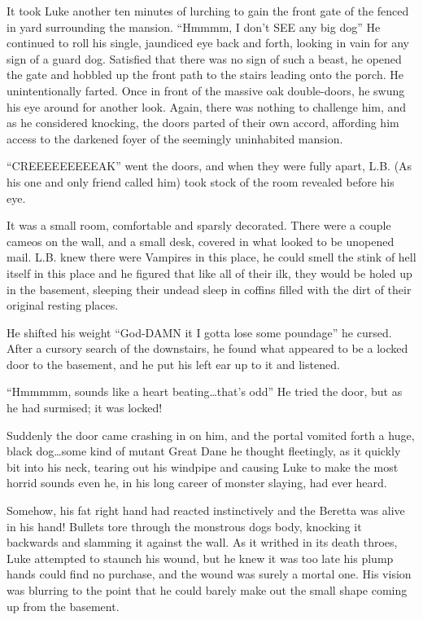 It took Luke another ten minutes of lurching to gain the front gate
of the fenced in yard surrounding the mansion. ``Hmmmm, I don't SEE
any big dog'' He continued to roll his single, jaundiced eye back
and forth, looking in vain for any sign of a guard dog. Satisfied
that there was no sign of such a beast, he opened the gate and
hobbled up the front path to the stairs leading onto the porch. He
unintentionally farted. Once in front of the massive oak
double-doors, he swung his eye around for another look. Again,
there was nothing to challenge him, and as he considered knocking,
the doors parted of their own accord, affording him access to the
darkened foyer of the seemingly uninhabited mansion.

``CREEEEEEEEEAK'' went the doors, and when they were fully apart,
L.B. (As his one and only friend called him) took stock of the room
revealed before his eye.

It was a small room, comfortable and sparsly decorated. There were
a couple cameos on the wall, and a small desk, covered in what
looked to be unopened mail. L.B. knew there were Vampires in this
place, he could smell the stink of hell itself in this place and he
figured that like all of their ilk, they would be holed up in the
basement, sleeping their undead sleep in coffins filled with the
dirt of their original resting places.

He shifted his weight ``God-DAMN it I gotta lose some poundage'' he
cursed. After a cursory search of the downstairs, he found what
appeared to be a locked door to the basement, and he put his left
ear up to it and listened.

``Hmmmmm, sounds like a heart beating{\ldots}that's odd'' He tried the
door, but as he had surmised; it was locked!

Suddenly the door came crashing in on him, and the portal vomited
forth a huge, black dog{\ldots}some kind of mutant Great Dane he thought
fleetingly, as it quickly bit into his neck, tearing out his
windpipe and causing Luke to make the most horrid sounds even he,
in his long career of monster slaying, had ever heard.

Somehow, his fat right hand had reacted instinctively and the
Beretta was alive in his hand! Bullets tore through the monstrous
dogs body, knocking it backwards and slamming it against the wall.
As it writhed in its death throes, Luke attempted to staunch his
wound, but he knew it was too late his plump hands could find no
purchase, and the wound was surely a mortal one. His vision was
blurring to the point that he could barely make out the small shape
coming up from the basement.

